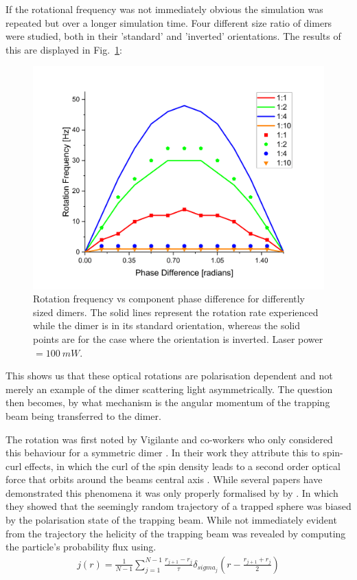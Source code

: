 If the rotational frequency was not immediately obvious the simulation was
repeated but over a longer simulation time. Four different size ratio of 
dimers were studied, both in their 'standard' and 'inverted' orientations. 
The results of this are displayed in Fig.~\ref{fig:rotation_vs_pol}:
\begin{figure}[h!]
	\centering
	\includegraphics[width=\linewidth]{rotation_vs_pol.png}
	\caption{Rotation frequency vs component phase difference for differently 
		sized dimers. The solid lines represent the rotation rate experienced 
		while the dimer is in its standard orientation, whereas the solid points 
		are for the case where the orientation is inverted. Laser power $= 100\ mW$.}
	\label{fig:rotation_vs_pol}
\end{figure}

This shows us that these optical rotations are polarisation dependent 
and not merely an example of the dimer scattering light asymmetrically. 
The question then becomes, by what mechanism is the angular momentum of
the trapping beam being transferred to the dimer.

The rotation was first noted by Vigilante and co-workers who only 
considered this behaviour for a symmetric dimer \cite{Vigilante2020}.
In their work they attribute this to spin-curl effects, in which the 
curl of the spin density leads to a second order optical force that 
orbits around the beams central axis \cite{Yevick2017}. While several 
papers have demonstrated this phenomena \cite{Zhao2007,Zhao2009, Wang2010} 
it was only properly formalised by by \cite{Ruffner2012}. In which they 
showed that the seemingly random trajectory of a trapped sphere was biased
by the polarisation state of the trapping beam. While not immediately evident 
from the trajectory the helicity of the trapping beam was revealed by 
computing the particle's probability flux using.
\begin{align}
	j(r) = \frac{1}{N-1} \sum_{j=1}^{N-1}
	\frac{r_{j+1}-r_j}{\tau}\delta_{sigma_j}\left(r-\frac{r_{j+1}+r_j}{2}\right)
	\label{eq:prob_flux}
\end{align}

